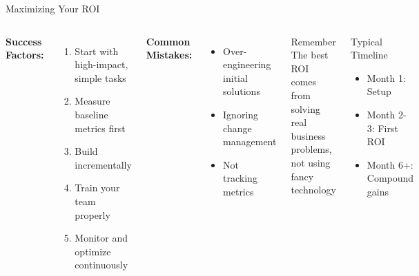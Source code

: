 \documentclass{beamer}
\begin{document}
\begin{frame}{Maximizing Your ROI}
  \begin{columns}[onlytextwidth]
      \textbf{Success Factors:}
      \begin{enumerate}
        \item Start with high-impact, simple tasks
        \item Measure baseline metrics first
        \item Build incrementally
        \item Train your team properly
        \item Monitor and optimize continuously
      \end{enumerate}
    
      \textbf{Common Mistakes:}
      \begin{itemize}
        \item Over-engineering initial solutions
        \item Ignoring change management
        \item Not tracking metrics
      \end{itemize}
      
      \begin{block}{Remember}
        The best ROI comes from solving real business problems, not using fancy technology
      \end{block}
      
      \vspace{0.3cm}
      
      \begin{block}{Typical Timeline}
        \begin{itemize}
          \item Month 1: Setup
          \item Month 2-3: First ROI
          \item Month 6+: Compound gains
        \end{itemize}
      \end{block}
  \end{columns}
\end{frame}
\end{document}
